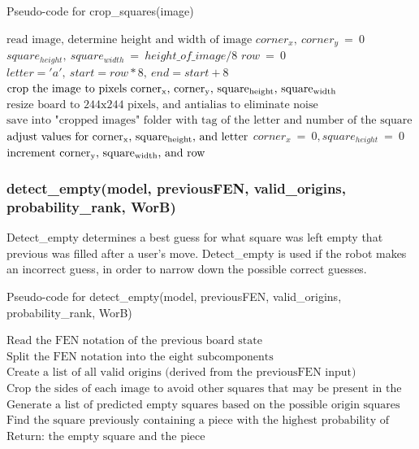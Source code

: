 \documentclass[onecolumn]{IEEEtran}
\begin{document}
\begin{algorithm}[H]
\caption{Pseudo-code for crop\_squares(image)}
\begin{algorithmic}[1]
\STATE $\text{read image, determine height and width of image}$
\STATE $corner_x,\:corner_y\:=\:0$ 
\STATE $square_{height},\:square_{width}\:=\:height\_of\_image / 8$ 
\STATE $row\:=\:0$
\STATE $letter = 'a',\:start = row*8,\:end = start + 8$
\STATE $\text{crop the image to pixels corner\textsubscript{x}, corner\textsubscript{y}, square\textsubscript{height}, square\textsubscript{width}}$ 
\STATE $\text{resize board to 244x244 pixels, and antialias to eliminate noise}$ 
\STATE $\text{save into "cropped images" folder with tag of the letter and number of the square (letter, column)}$
\STATE $\text{adjust values for corner\textsubscript{x}, square\textsubscript{height}, and letter}$ 
\ENDFOR
\STATE $corner_x\:=\:0, square_{height}\:=\:0$
\STATE $\text{increment corner\textsubscript{y}, square\textsubscript{width}, and row}$ 
\ENDWHILE
\end{algorithmic}
\end{algorithm}
\subsubsection{detect\_empty(model, previousFEN, valid\_origins, probability\_rank, WorB)}
Detect\_empty determines a best guess for what square was left empty that previous was filled after a user's move. Detect\_empty is used if the robot makes an incorrect guess, in order to narrow down the possible correct guesses.

\begin{algorithm}[H]
\caption{Pseudo-code for detect\_empty(model, previousFEN, valid\_origins, probability\_rank, WorB)}
\begin{algorithmic}[1]
\STATE $\text{Read the FEN notation of the previous board state}$
\STATE $\text{Split the FEN notation into the eight subcomponents}$
\STATE $\text{Create a list of all valid origins (derived from the previousFEN input)}$
\STATE $\text{Crop the sides of each image to avoid other squares that may be present in the image}$
\STATE $\text{Generate a list of predicted empty squares based on the possible origin squares and analysis of the images}$
\STATE $\text{Find the square previously containing a piece with the highest probability of being empty after the user's move}$
\STATE $\text{Return: the empty square and the piece}$
\end{algorithmic}
\end{algorithm}
\end{document}
